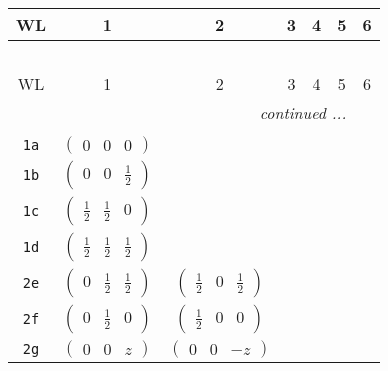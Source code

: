 \documentclass[fleqn,9pt,landscape]{jsarticle}
\begin{document}
\begin{center}
\renewcommand{\arraystretch}{1.2}
\begin{longtable}{ccccccc}
 \hline \hline
WL & 1 & 2 & 3 & 4 & 5 & 6 \\ \hline \endfirsthead

\multicolumn{6}{l}{\tablename\ \thetable{}} \\
 \hline \hline
WL & 1 & 2 & 3 & 4 & 5 & 6 \\ \hline \endhead

 \hline \hline
\multicolumn{6}{r}{\footnotesize\it continued ...} \\ \endfoot

 \hline \hline
\multicolumn{6}{r}{} \\ \endlastfoot

{\tt 1a} & $ \begin{pmatrix} 0 & 0 & 0 \end{pmatrix} $ & $  $ & $  $ & $  $ & $  $ & $  $ \\ \hline
{\tt 1b} & $ \begin{pmatrix} 0 & 0 & \frac{1}{2} \end{pmatrix} $ & $  $ & $  $ & $  $ & $  $ & $  $ \\ \hline
{\tt 1c} & $ \begin{pmatrix} \frac{1}{2} & \frac{1}{2} & 0 \end{pmatrix} $ & $  $ & $  $ & $  $ & $  $ & $  $ \\ \hline
{\tt 1d} & $ \begin{pmatrix} \frac{1}{2} & \frac{1}{2} & \frac{1}{2} \end{pmatrix} $ & $  $ & $  $ & $  $ & $  $ & $  $ \\ \hline
{\tt 2e} & $ \begin{pmatrix} 0 & \frac{1}{2} & \frac{1}{2} \end{pmatrix} $ & $ \begin{pmatrix} \frac{1}{2} & 0 & \frac{1}{2} \end{pmatrix} $ & $  $ & $  $ & $  $ & $  $ \\ \hline
{\tt 2f} & $ \begin{pmatrix} 0 & \frac{1}{2} & 0 \end{pmatrix} $ & $ \begin{pmatrix} \frac{1}{2} & 0 & 0 \end{pmatrix} $ & $  $ & $  $ & $  $ & $  $ \\ \hline
{\tt 2g} & $ \begin{pmatrix} 0 & 0 & z \end{pmatrix} $ & $ \begin{pmatrix} 0 & 0 & - z \end{pmatrix} $ & $  $ & $  $ & $  $ & $  $ \\ \hline

\end{longtable}
\end{center}
\end{document}
